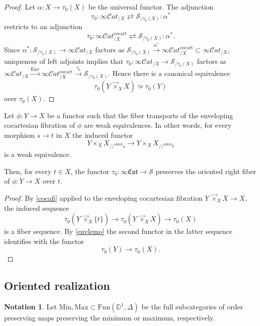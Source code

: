 \documentclass[10pt,oneside]{article}
\numberwithin{equation}{section} %
\numberwithin{figure}{section} %
\theoremstyle{plain}
\theoremstyle{definition}
\newtheorem{notation}[thm]{Notation}
\newcommand{\bD}{{\mathbb D}}
\newcommand{\mS}{{\mathcal S}}
\newcommand{\Min}{\mathrm{Min}}
\newcommand{\Max}{\mathrm{Max}}
\newcommand{\Env}{{\mathrm{Env}}}
\newcommand{\Fun}{\mathrm{Fun}}
\newcommand{\cocart}{{\mathrm{cocart}}}
\newcommand{\oplax}{{\mathrm{oplax}}}
\newcommand{\scat}{\mathcal{C}\mathit{at}}
\newcommand{\fcat}{\mathfrak{Cat}}
\begin{document}
\begin{proof}Let $\alpha: X \to \tau_0(X)$ be the universal functor.
The adjunction $$\tau_0: \infty\scat_{/X} \rightleftarrows \mS_{/\tau_0(X)} : \alpha^* $$
restricts to an adjunction $$\tau_0: \infty\scat^\cocart_{/X} \rightleftarrows \mS_{/\tau_0(X)} : \alpha^*. $$
Since $\alpha^*: \mS_{/\tau_0(X)} \to \infty\scat_{/X} $ factors as
$\mS_{/\tau_0(X)} \xrightarrow{\alpha^*} \infty\scat^\cocart_{/X}  \subset \infty\scat_{/X} $, uniqueness of left adjoints implies that 
$ \tau_0: \infty\scat_{/X} \to \mS_{/\tau_0(X)}$ factors as
$  \infty\scat_{/X} \xrightarrow{\Env}  \infty\scat^\cocart_{/X} \xrightarrow{\tau_0} \mS_{/\tau_0(X)}. $
Hence there is a canonical equivalence 
$$ \tau_0(Y \,{\vec{\times}}_X X) \simeq \tau_0(Y)$$ over $\tau_0(X).$
\end{proof}

\begin{theorem}\label{QuillenB}
Let $\phi: Y \to X$ be a functor such that the fiber transports of the enveloping cocartesian fibration of $\phi$ are weak equivalences.  
In other words, for every morphism $s \to t $ in $X$
the induced functor $$ Y \times_X X_{//^\oplax s} \to Y \times_X X_{//^\oplax t} $$
is a weak equivalence.

Then, for every $t \in X $, the functor $\tau_0: \infty\fcat \to \mS$
preserves the oriented right fiber of $\phi: Y \to X $ over $t$.

\end{theorem}

\begin{proof}

By \cref{cocafi} applied to the enveloping cocartesian fibration $ Y \,{\vec{\times}}_X X \to X $, the induced sequence
$$\tau_0(Y \,{\vec{\times}}_X \{ t\}) \to \tau_0(Y \,{\vec{\times}}_X X) \to \tau_0(X) $$
is a fiber sequence.
By \cref{envlemo} the second functor in the latter sequence identifies with the functor
$$ \tau_0(Y) \to \tau_0(X).$$
\end{proof}


\subsection{Oriented realization}

\begin{notation}
Let $\Min, \Max \subset \Fun(\bD^1, \Delta)$ be the full subcategories of order preserving maps preserving the minimum or maximum, respectively. 
    
\end{notation}
\end{document}

